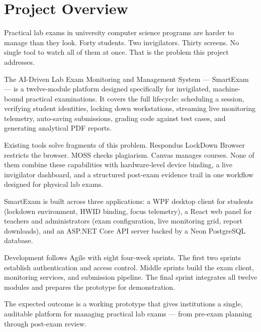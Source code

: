 \newpage
\thispagestyle{empty}
\chapter*{\centering Project Overview}

Practical lab exams in university computer science programs are harder to manage than they look. Forty students. Two invigilators. Thirty screens. No single tool to watch all of them at once. That is the problem this project addresses.

The AI-Driven Lab Exam Monitoring and Management System — SmartExam — is a twelve-module platform designed specifically for invigilated, machine-bound practical examinations. It covers the full lifecycle: scheduling a session, verifying student identities, locking down workstations, streaming live monitoring telemetry, auto-saving submissions, grading code against test cases, and generating analytical PDF reports.

Existing tools solve fragments of this problem. Respondus LockDown Browser restricts the browser. MOSS checks plagiarism. Canvas manages courses. None of them combine these capabilities with hardware-level device binding, a live invigilator dashboard, and a structured post-exam evidence trail in one workflow designed for physical lab exams.

SmartExam is built across three applications: a WPF desktop client for students (lockdown environment, HWID binding, focus telemetry), a React web panel for teachers and administrators (exam configuration, live monitoring grid, report downloads), and an ASP.NET Core API server backed by a Neon PostgreSQL database.

Development follows Agile with eight four-week sprints. The first two sprints establish authentication and access control. Middle sprints build the exam client, monitoring services, and submission pipeline. The final sprint integrates all twelve modules and prepares the prototype for demonstration.

The expected outcome is a working prototype that gives institutions a single, auditable platform for managing practical lab exams — from pre-exam planning through post-exam review.
